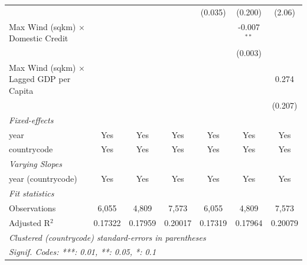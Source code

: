 \begin{tabular}{lcccccc}
                                                    &             &                        &                & (0.035)     & (0.200)                & (2.06)\\   
   Max Wind (sqkm) $\times$ Domestic Credit         &             &                        &                &             & -0.007$^{**}$          &   \\   
                                                    &             &                        &                &             & (0.003)                &   \\   
   Max Wind (sqkm) $\times$ Lagged GDP per Capita   &             &                        &                &             &                        & 0.274\\   
                                                    &             &                        &                &             &                        & (0.207)\\   
   \midrule
   \emph{Fixed-effects}\\
   year                                             & Yes         & Yes                    & Yes            & Yes         & Yes                    & Yes\\  
   countrycode                                      & Yes         & Yes                    & Yes            & Yes         & Yes                    & Yes\\  
   \midrule
   \emph{Varying Slopes}\\
   year (countrycode)                               & Yes         & Yes                    & Yes            & Yes         & Yes                    & Yes\\  
   \midrule
   \emph{Fit statistics}\\
   Observations                                     & 6,055       & 4,809                  & 7,573          & 6,055       & 4,809                  & 7,573\\  
   Adjusted R$^2$                                   & 0.17322     & 0.17959                & 0.20017        & 0.17319     & 0.17964                & 0.20079\\  
   \midrule \midrule
   \multicolumn{7}{l}{\emph{Clustered (countrycode) standard-errors in parentheses}}\\
   \multicolumn{7}{l}{\emph{Signif. Codes: ***: 0.01, **: 0.05, *: 0.1}}\\
\end{tabular}
\par\endgroup


